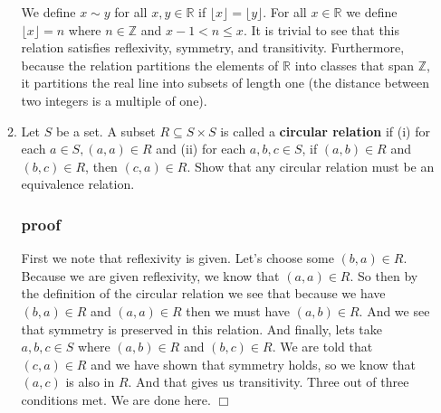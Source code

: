 \documentclass[letterpaper]{article}
\begin{document}
\begin{enumerate}
\begin{enumerate}
    We define $x\sim y$ for all $x,y\in\mathbb{R}$ if $\lfloor x\rfloor=\lfloor y\rfloor$. For all $x\in\mathbb{R}$ we define $\lfloor x\rfloor=n$ where $n\in\mathbb{Z}$ and $x-1<n\le x$. It is trivial to see that this relation satisfies reflexivity, symmetry, and transitivity. Furthermore, because the relation partitions the elements of $\mathbb{R}$ into classes that span $\mathbb{Z}$, it partitions the real line into subsets of length one (the distance between two integers is a multiple of one).
  \setcounter{enumii}{8}
  \item
    Let $S$ be a set. A subset $R\subseteq S\times S$ is called a {\bfseries circular relation} if (i) for each $a\in S, (a,a)\in R$ and (ii) for each $a,b,c\in S$, if $(a,b)\in R$ and $(b,c)\in R$, then $(c,a)\in R$. Show that any circular relation must be an equivalence relation.

  \subsubsection*{proof}
  First we note that reflexivity is given. Let's choose some $(b,a)\in R$. Because we are given reflexivity, we know that $(a,a)\in R$. So then by the definition of the circular relation we see that because we have $(b,a)\in R$ and $(a,a)\in R$ then we must have $(a,b)\in R$. And we see that symmetry is preserved in this relation. And finally, lets take $a,b,c\in S$ where $(a,b)\in R$ and $(b,c)\in R$. We are told that $(c,a)\in R$ and we have shown that symmetry holds, so we know that $(a,c)$ is also in $R$. And that gives us transitivity. Three out of three conditions met. We are done here.
  $\Box$
  \end{enumerate}
\end{enumerate}
\end{document}
